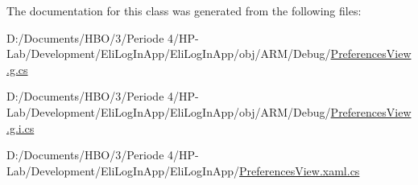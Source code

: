 The documentation for this class was generated from the following files\+:\begin{DoxyCompactItemize}
\item 
D\+:/\+Documents/\+H\+B\+O/3/\+Periode 4/\+H\+P-\/\+Lab/\+Development/\+Eli\+Log\+In\+App/\+Eli\+Log\+In\+App/obj/\+A\+R\+M/\+Debug/\hyperlink{_a_r_m_2_debug_2_preferences_view_8g_8cs}{Preferences\+View.\+g.\+cs}\item 
D\+:/\+Documents/\+H\+B\+O/3/\+Periode 4/\+H\+P-\/\+Lab/\+Development/\+Eli\+Log\+In\+App/\+Eli\+Log\+In\+App/obj/\+A\+R\+M/\+Debug/\hyperlink{_a_r_m_2_debug_2_preferences_view_8g_8i_8cs}{Preferences\+View.\+g.\+i.\+cs}\item 
D\+:/\+Documents/\+H\+B\+O/3/\+Periode 4/\+H\+P-\/\+Lab/\+Development/\+Eli\+Log\+In\+App/\+Eli\+Log\+In\+App/\hyperlink{_preferences_view_8xaml_8cs}{Preferences\+View.\+xaml.\+cs}\end{DoxyCompactItemize}
